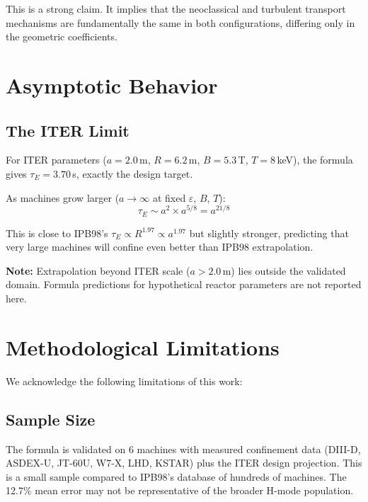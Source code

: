 \documentclass[11pt,letterpaper]{article}
\newcommand{\tauE}{\tau_E}
\begin{document}
This is a strong claim. It implies that the neoclassical and turbulent transport mechanisms are fundamentally the same in both configurations, differing only in the geometric coefficients.

\section{Asymptotic Behavior}

\subsection{The ITER Limit}

For ITER parameters ($a = 2.0$\,m, $R = 6.2$\,m, $B = 5.3$\,T, $T = 8$\,keV), the formula gives $\tauE = 3.70$\,s, exactly the design target.

As machines grow larger ($a \to \infty$ at fixed $\varepsilon$, $B$, $T$):
\begin{equation}
\tauE \sim a^2 \times a^{5/8} = a^{21/8}
\end{equation}

This is close to IPB98's $\tauE \propto R^{1.97} \propto a^{1.97}$ but slightly stronger, predicting that very large machines will confine even better than IPB98 extrapolation.

\textbf{Note:} Extrapolation beyond ITER scale ($a > 2.0$\,m) lies outside the validated domain. Formula predictions for hypothetical reactor parameters are not reported here.

\section{Methodological Limitations}

We acknowledge the following limitations of this work:

\subsection{Sample Size}

The formula is validated on 6 machines with measured confinement data (DIII-D, ASDEX-U, JT-60U, W7-X, LHD, KSTAR) plus the ITER design projection. This is a small sample compared to IPB98's database of hundreds of machines. The 12.7\% mean error may not be representative of the broader H-mode population.
\end{document}
